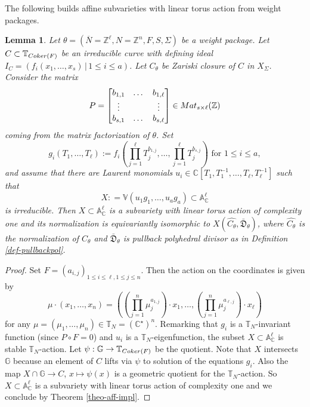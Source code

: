 \documentclass[11pt, reqno]{amsart}
\theoremstyle{plain}
\newtheorem{lemma}[theorem]{Lemma}
\theoremstyle{definition}
\theoremstyle{remark}
\begin{document}
The following builds affine subvarieties with linear torus action from weight packages. 
\begin{lemma}\label{lem-equa-tvar}
Let $\theta =  (\overline{N}=  \mathbb{Z}^{\ell}, N  =  \mathbb{Z}^{n}, F, S,\Sigma)$ be a weight package.
Let $C\subset \mathbb{T}_{{\rm Coker}(F)}$ be an irreducible curve with defining ideal $I_{C} =  (f_{i}(x_{1}, \ldots, x_{s})\,|\, 1\leq i\leq a)$. Let $C_{\theta}$ be Zariski closure of $C$ in $X_{\Sigma}$. Consider the matrix 
$$P =   \begin{bmatrix} 
     b_{1,1} & \dots & b_{1, \ell}\\
    \vdots &     & \vdots  \\
     b_{s,1} & \dots & b_{s, \ell}
    \end{bmatrix}\in {\rm Mat}_{s\times \ell}(\mathbb{Z})$$
coming from the matrix factorization of $\theta$.
Set 
$$g_{i}(T_{1}, \ldots, T_{\ell}):= f_{i}\left(\prod_{j = 1}^{\ell}T_{j}^{b_{1, j}}, \ldots, \prod_{j = 1}^{\ell}T_{j}^{b_{s, j}}\right)\text{ for } 1\leq i\leq a,$$
and assume that there are Laurent monomials $u_{i}\in \mathbb{C}[T_{1}, T_{1}^{-1}, \ldots, T_{\ell}, T_{\ell}^{-1}]$ such
that $$X: = \mathbb{V}(u_{1}g_{1}, \ldots, u_{a}g_{a})\subset \mathbb{A}^{\ell}_{\mathbb{C}}$$ is irreducible. 
Then $X\subset \mathbb{A}^{\ell}_{\mathbb{C}}$ is a subvariety with linear torus action of complexity one and its normalization is equivariantly isomorphic to $X(\widehat{C_{\theta}}, \bar{\mathfrak{D}}_{\theta})$, where $\widehat{C_{\theta}}$ is the normalization of $C_{\theta}$ and $\bar{\mathfrak{D}}_{\theta}$ is pullback polyhedral divisor as in Definition \ref{def-pullbackpol}.
\end{lemma}
\begin{proof}
Set $F =  (a_{i, j})_{1\leq i\leq \ell, 1\leq j\leq n}$. Then the action on the coordinates is given by 
$$\mu\cdot (x_{1}, \ldots, x_{n}) = \left(\left(\prod_{j = 1}^{n}\mu_{j}^{a_{1, j}}\right) \cdot x_{1}, \ldots, \left(\prod_{j = 1}^{n}\mu_{j}^{a_{\ell, j}}\right) \cdot x_{\ell}\right)$$
for any $\mu =  (\mu_{1}, \ldots, \mu_{n})\in \mathbb{T}_{N} =  (\mathbb{C}^{\star})^{n}$.
Remarking that $g_{i}$ is a $\mathbb{T}_{N}$-invariant function (since $P\circ F =  0$) and $u_{i}$ is a $\mathbb{T}_{N}$-eigenfunction,  the subset $X\subset \mathbb{A}^{\ell}_{\mathbb{C}}$ is stable $\mathbb{T}_{N}$-action. Let  $\psi: \mathbb{G}\rightarrow \mathbb{T}_{{\rm Coker}(F)}$ be the quotient. Note that $X$ intersects $\mathbb{G}$ because an element of $C$ lifts via $\psi$ to solution  
of the equations $g_{i}$. Also the map $X\cap \mathbb{G}\rightarrow C$, $x\mapsto \psi(x)$ is a geometric quotient for the $\mathbb{T}_{N}$-action. So $X\subset \mathbb{A}^{\ell}_{\mathbb{C}}$ is
a subvariety with linear torus action of complexity one and 
we conclude by Theorem \ref{theo-aff-impl}.
\end{proof}
\end{document}
